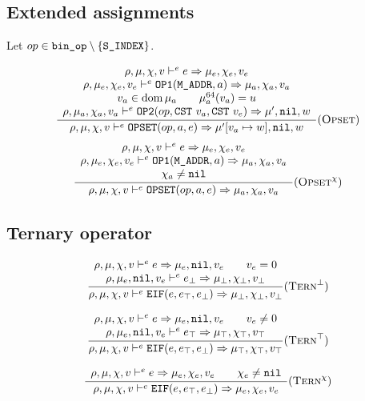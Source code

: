 \subsection{Extended assignments}
Let \(op\in \texttt{bin\_op}\setminus \{ \texttt{S\_INDEX} \}\).

\[\dfrac{\begin{array}{c}
    \rho,\mu,\chi,v \gives^e e \tto \mu_e,\chi_e,v_e \\
    \rho,\mu_e,\chi_e,v_e \gives^e \t{OP1}(\t{M\_ADDR}, a) \tto \mu_a,\chi_a,v_a \\
    v_a\in\dom\mu_a \qquad \mu_a^{64}(v_a) = u \\
    \rho,\mu_a,\chi_a,v_a \gives^e \t{OP2}(op, \t{CST}\ v_a, \t{CST}\ v_e) \tto \mu',\nil,w
\end{array}}{\rho,\mu,\chi,v \gives^e \t{OPSET}(op, a, e) \tto \mu'[v_a\mapsto w],\nil,w} \rule{Opset}{}\]
\[\dfrac{\begin{array}{c}
    \rho,\mu,\chi,v \vdash^e e\Rightarrow \mu_e,\chi_e,v_e \\
    \rho,\mu_e,\chi_e,v_e \vdash^e \texttt{OP1}(\texttt{M\_ADDR}, a) \Rightarrow \mu_a,\chi_a,v_a \\
    \chi_a\ne\texttt{nil} \\
\end{array}}{\rho,\mu,\chi,v \vdash^e \texttt{OPSET}(op, a, e) \Rightarrow \mu_a,\chi_a,v_a} (\textsc{Opset}^\chi)\]

\subsection{Ternary operator}
\[\dfrac{\begin{array}{c}
    \rho,\mu,\chi,v \vdash^e e\Rightarrow \mu_e,\texttt{nil},v_e \qquad v_e = 0\\
    \rho,\mu_e,\texttt{nil},v_e \vdash^e e_\bot \Rightarrow \mu_\bot,\chi_\bot,v_\bot
\end{array}}{\rho,\mu,\chi,v \vdash^e \texttt{EIF}(e, e_\top, e_\bot) \Rightarrow \mu_\bot,\chi_\bot,v_\bot}(\textsc{Tern}^\bot)\]

\[\dfrac{\begin{array}{c}
    \rho,\mu,\chi,v \vdash^e e\Rightarrow \mu_e,\texttt{nil},v_e \qquad v_e \ne 0\\
    \rho,\mu_e,\texttt{nil},v_e \vdash^e e_\top \Rightarrow \mu_\top,\chi_\top,v_\top \\
\end{array}}{\rho,\mu,\chi,v \vdash^e \texttt{EIF}(e, e_\top, e_\bot) \Rightarrow \mu_\top,\chi_\top,v_\top}(\textsc{Tern}^\top)\]

\[\dfrac{\begin{array}{c}
    \rho,\mu,\chi,v \vdash^e e\Rightarrow \mu_e,\chi_e,v_e \qquad \chi_e\ne\texttt{nil}
\end{array}}{\rho,\mu,\chi,v \vdash^e \texttt{EIF}(e, e_\top, e_\bot) \Rightarrow \mu_e,\chi_e,v_e}(\textsc{Tern}^\chi)\]


